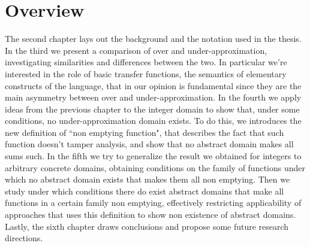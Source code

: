 \section{Overview}
The second chapter lays out the background and the notation used in the thesis.
In the third we present a comparison of over and under-approximation, investigating similarities and differences between the two. In particular we're interested in the role of basic transfer functions, the semantics of elementary constructs of the language, that in our opinion is fundamental since they are the main asymmetry between over and under-approximation.
In the fourth we apply ideas from the previous chapter to the integer domain to show that, under some conditions, no under-approximation domain exists. To do this, we introduces the new definition of ``non emptying function", that describes the fact that such function doesn't tamper analysis, and show that no abstract domain makes all sums such.
In the fifth we try to generalize the result we obtained for integers to arbitrary concrete domains, obtaining conditions on the family of functions under which no abstract domain exists that makes them all non emptying. Then we study under which conditions there do exist abstract domains that make all functions in a certain family non emptying, effectively restricting applicability of approaches that uses this definition to show non existence of abstract domains.
Lastly, the sixth chapter draws conclusions and propose some future research directions.
